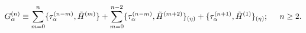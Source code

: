 \begin{equation}
  G_\alpha ^{(n)}\equiv \sum_{m=0}^n  \{\tau_\alpha ^{(n-m)}, \tilde{H}^{(m)}\}+
  \sum_{m=0}^{n-2}   \{ \tau_\alpha ^{(n-m)}, \tilde{H}^{(m+2)}\}_{(\eta)}+\{\tau_\alpha
  ^{(n+1)}, \tilde{H}^{(1)}\}_{(\eta)}; \hspace {0.5 cm} n\geq2.
  \label{a21}
  \end{equation}

